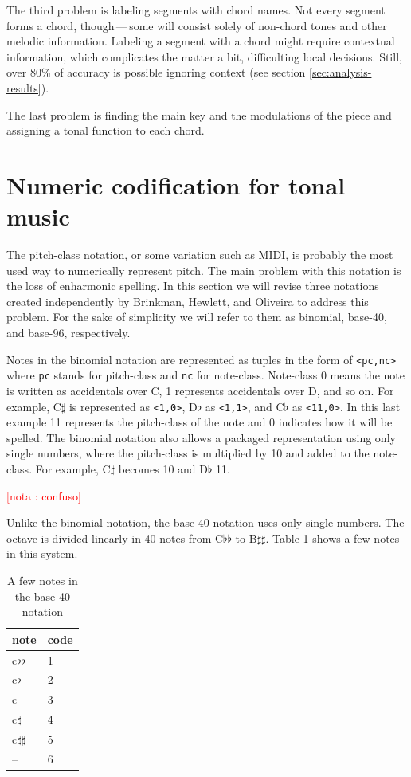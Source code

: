 \documentclass{article}
\newcounter{notacounter}
\newcommand{\nota}[1]{
  \addtocounter{notacounter}{1}
  \textcolor{red}{[nota \arabic{notacounter}: #1]}
}
\begin{document}
The third problem is labeling segments with chord names. Not every
segment forms a chord, though\,---\,some will consist solely of non-chord
tones and other melodic information. Labeling a segment with a chord might
require contextual information, which complicates the matter a bit,
difficulting local decisions. Still, over 80\% of accuracy is possible
ignoring context (see section \ref{sec:analysis-results}).

The last problem is finding the main key and the modulations of the
piece and assigning a tonal function to each chord.

\section{Numeric codification for tonal music}
\label{sec:codificacao-jamary}

The pitch-class notation, or some variation such as MIDI, is probably
the most used way to numerically represent pitch. The main problem
with this notation is the loss of enharmonic spelling. In this section
we will revise three notations created independently by Brinkman,
Hewlett, and Oliveira \cite{brinkman:binomial, hewlett:base-40,
  oliveira:busca} to address this problem. For the sake of simplicity
we will refer to them as binomial, base-40, and base-96, respectively.

Notes in the binomial notation are represented as tuples in the form
of \texttt{<pc,nc>} where \texttt{pc} stands for pitch-class and
\texttt{nc} for note-class. Note-class 0 means the note is written as
accidentals over C, 1 represents accidentals over D, and so on. For
example, C$\sharp$ is represented as \texttt{<1,0>}, D$\flat$ as
\texttt{<1,1>}, and C$\flat$ as \texttt{<11,0>}. In this last example
11 represents the pitch-class of the note and 0 indicates how it will
be spelled. The binomial notation also allows a packaged
representation using only single numbers, where the pitch-class is
multiplied by 10 and added to the note-class. For example, C$\sharp$
becomes 10 and D$\flat$ 11. \nota{confuso}

Unlike the binomial notation, the base-40 notation uses only single
numbers. The octave is divided linearly in 40 notes from C$\flat\flat$
to B$\sharp\sharp$. Table \ref{tab:base40} shows a few notes in this
system.

\begin{table}
  \centering
  \begin{tabular}{l|l}
    note & code \\
    \hline
    c$\flat\flat$ & 1 \\
    c$\flat$ & 2 \\
    c & 3 \\
    c$\sharp$ & 4 \\
    c$\sharp\sharp$ & 5 \\
    -- & 6 \\
  \end{tabular}
  \caption{A few notes in the base-40 notation}
  \label{tab:base40}
\end{table}
\end{document}
